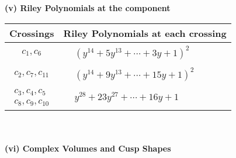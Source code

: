 \documentclass[1p]{elsarticle_modified}
\theoremstyle{definition}
\begin{document}
\newpage\renewcommand{\arraystretch}{1}
\flushleft \textbf{(v) Riley Polynomials at the component}\newline \\
\begin{tabular}{m{50pt}|m{274pt}}
Crossings & \hspace{64pt}Riley Polynomials at each crossing \\
\hline $$\begin{aligned}c_{1},c_{6}\end{aligned}$$&$\begin{aligned}
&(y^{14}+5 y^{13}+\cdots+3 y+1)^{2}
\end{aligned}$\\
\hline $$\begin{aligned}c_{2},c_{7},c_{11}\end{aligned}$$&$\begin{aligned}
&(y^{14}+9 y^{13}+\cdots+15 y+1)^{2}
\end{aligned}$\\
\hline $$\begin{aligned}c_{3},c_{4},c_{5}\\c_{8},c_{9},c_{10}\end{aligned}$$&$\begin{aligned}
&y^{28}+23 y^{27}+\cdots+16 y+1
\end{aligned}$\\
\hline
\end{tabular}\\~\\
\newpage\flushleft \textbf{(vi) Complex Volumes and Cusp Shapes}
\end{document}
